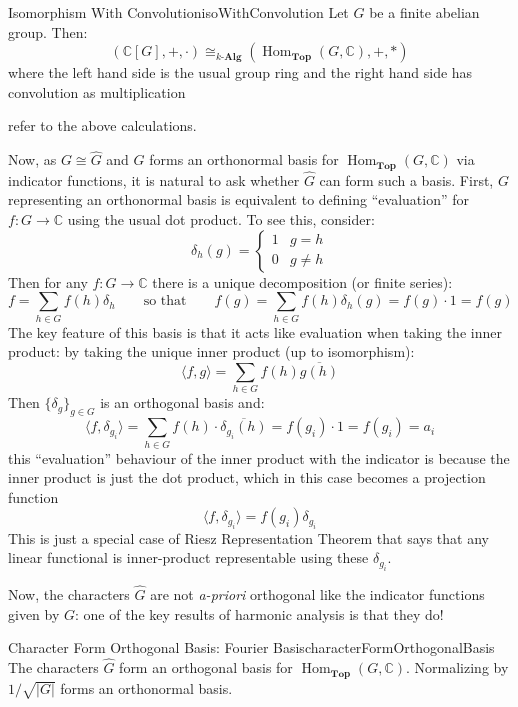 \documentclass{article}
\newcommand{\C}{{\mathbb{C}}}
\newcommand{\Top}{{\textbf{Top}}}
\newcommand{\Hom}{{\operatorname{Hom}}}
\renewcommand{\bf}[1]{\textbf{#1}}
\begin{document}
\begin{lem}{Isomorphism With Convolution}{isoWithConvolution}
	Let $G$ be a finite abelian group. Then:
	\[
    (\C[G], +, \cdot) \cong_{k\text{-}\bf{Alg}} (\Hom_\Top(G, \C), +, *)
	\]
	where the left hand side is the usual group ring and the right hand side has convolution as multiplication
\end{lem}

\begin{Proof}
	refer to the above calculations.
\end{Proof}

Now, as $G\cong \hat{G}$ and $G$ forms an orthonormal basis for $\Hom_\Top(G, \C)$ via indicator functions, it
is natural to ask whether $\hat{G}$ can form such a basis. First, $G$ representing an orthonormal basis is
equivalent to defining ``evaluation'' for $f: G \to \C$ using the usual dot product. To see this, consider:
\[
	\delta_h(g) = \begin{cases}
		1 & g=h\\
		0 & g \ne h
	\end{cases}
\]
Then for any $f: G \to \C$ there is a unique decomposition (or finite series):
\[
	f = \sum_{h \in G} f(h)\delta_h \qquad \text{so that} \qquad f(g) = \sum_{h \in G} f(h)\delta_h(g)
	= f(g)\cdot 1 = f(g)
\]
The key feature of this basis is that it acts like evaluation when taking the inner product: by taking the
unique inner product (up to isomorphism):
\[
	\langle f,g \rangle = \sum_{h \in G} f(h)\overline{g(h)}
\]
Then $\{\delta_g\}_{g \in G}$ is an orthogonal basis and:
\[
  \langle f, \delta_{g_i} \rangle = \sum_{h\in G} f(h) \cdot \overline{\delta_{g_i}(h)} = f(g_i) \cdot 1 = f(g_i)
	= a_i
\]
this ``evaluation'' behaviour of the inner product with the indicator is because the inner product is just the
dot product, which in this case becomes a projection function
\[
  \langle f, \delta_{g_i} \rangle =  f(g_i)\delta_{g_i}
\]
This is just a special case of Riesz Representation Theorem that says that any linear functional is
inner-product representable using these $\delta_{g_i}$.

Now, the characters $\hat{G}$ are not \emph{a-priori} orthogonal like the indicator functions given by $G$:
one of the key results of harmonic analysis is that they do!
\begin{prop}{Character Form Orthogonal Basis: Fourier Basis}{characterFormOrthogonalBasis}
	The characters $\widehat{G}$ form an orthogonal basis for $\Hom_{\Top}(G, \C)$. Normalizing by
	$1/\sqrt{|G|}$ forms an orthonormal basis.
\end{prop}
\end{document}
